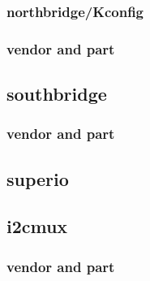 \documentclass[10pt,letterpaper]{article}
\begin{document}
\subsubsection{northbridge/Kconfig}




\subsubsection{vendor and part}
\subsection{southbridge}
\subsubsection{vendor and part}
\subsection{superio}
\subsection{i2cmux}
\subsubsection{vendor and part}
\end{document}
